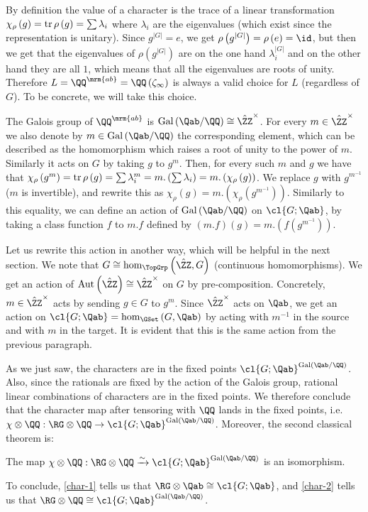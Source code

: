 By definition the value of a character is the trace of a linear transformation $\chi_\rho\left(g\right) = \operatorname{tr} \rho\left(g\right) = \sum \lambda_i$ where $\lambda_i$ are the eigenvalues (which exist since the representation is unitary).
Since $g^{\left|G\right|} = e$, we get $\rho\left(g^{\left|G\right|}\right) = \rho\left(e\right) = \id$, but then we get that the eigenvalues of $\rho\left(g^{\left|G\right|}\right)$ are on the one hand $\lambda_i^{\left|G\right|}$ and on the other hand they are all $1$, which means that all the eigenvalues are roots of unity.
Therefore $L = \QQ^\mrm{ab} = \QQ\left(\zeta_\infty\right)$ is always a valid choice for $L$ (regardless of $G$).
To be concrete, we will take this choice.

The Galois group of $\QQ^\mrm{ab}$ is $\Gal\left(\Qab / \QQ\right) \cong {\hat\ZZ}^\times$.
For every $m \in {\hat\ZZ}^\times$ we also denote by $m \in \Gal\left(\Qab / \QQ\right)$ the corresponding element, which can be described as the homomorphism which raises a root of unity to the power of $m$.
Similarly it acts on $G$ by taking $g$ to $g^m$.
Then, for every such $m$ and $g$ we have that
$
\chi_\rho\left(g^m\right)
= \operatorname{tr} \rho\left(g\right)
= \sum \lambda_i^m
= m. \left(\sum \lambda_i\right)
= m. \left(\chi_\rho\left(g\right)\right)
$.
We replace $g$ with $g^{m^{-1}}$ ($m$ is invertible), and rewrite this as $\chi_\rho\left(g\right) = m. \left(\chi_\rho\left(g^{m^{-1}}\right)\right)$.
Similarly to this equality, we can define an action of $\Gal\left(\Qab / \QQ\right)$ on $\cl{G; \Qab}$, by taking a class function $f$ to $m.f$ defined by $\left(m.f\right)\left(g\right) = m. \left(f\left(g^{m^{-1}}\right)\right)$.

Let us rewrite this action in another way, which will be helpful in the next section.
We note that $G \cong \hom_{\TopGrp}\left(\hat\ZZ, G\right)$ (continuous homomorphisms).
We get an action of $\aut\left(\hat\ZZ\right) \cong {\hat\ZZ}^\times$ on $G$ by pre-composition.
Concretely, $m \in {\hat\ZZ}^\times$ acts by sending $g \in G$ to $g^m$.
Since ${\hat\ZZ}^\times$ acts on $\Qab$, we get an action on $\cl{G; \Qab} = \hom_{\GSet}\left(G,  \Qab\right)$ by acting with $m^{-1}$ in the source and with $m$ in the target.
It is evident that this is the same action from the previous paragraph.

As we just saw, the characters are in the fixed points $\cl{G; \Qab}^{\Gal\left(\Qab / \QQ\right)}$.
Also, since the rationals are fixed by the action of the Galois group, rational linear combinations of characters are in the fixed points.
We therefore conclude that the character map after tensoring with $\QQ$ lands in the fixed points, i.e. $\chi \otimes \QQ: \RG \otimes \QQ \to \cl{G; \Qab}^{\Gal\left(\Qab / \QQ\right)}$.
Moreover, the second classical theorem is:

\begin{theorem}\label{char-2}
	The map $\chi \otimes \QQ: \RG \otimes \QQ \xrightarrow{\sim} \cl{G; \Qab}^{\Gal\left(\Qab / \QQ\right)}$ is an isomorphism.
\end{theorem}

To conclude, \ref{char-1} tells us that $\RG \otimes \Qab \cong \cl{G; \Qab}$, and \ref{char-2} tells us that $\RG \otimes \QQ \cong \cl{G; \Qab}^{\Gal\left(\Qab / \QQ\right)}$.

